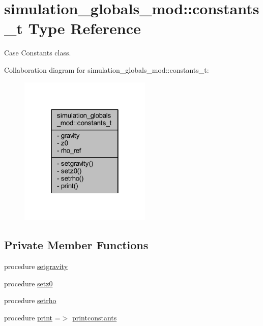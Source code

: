 \hypertarget{structsimulation__globals__mod_1_1constants__t}{}\section{simulation\+\_\+globals\+\_\+mod\+:\+:constants\+\_\+t Type Reference}
\label{structsimulation__globals__mod_1_1constants__t}


Case Constants class.  




Collaboration diagram for simulation\+\_\+globals\+\_\+mod\+:\+:constants\+\_\+t\+:
\nopagebreak
\begin{figure}[H]
\begin{center}
\leavevmode
\includegraphics[width=178pt]{structsimulation__globals__mod_1_1constants__t__coll__graph}
\end{center}
\end{figure}
\subsection*{Private Member Functions}
\begin{DoxyCompactItemize}
\item 
procedure \mbox{\hyperlink{structsimulation__globals__mod_1_1constants__t_af7a73fd39f95eb68c5d070c08d14bb4d}{setgravity}}
\item 
procedure \mbox{\hyperlink{structsimulation__globals__mod_1_1constants__t_a0ad20f9a9b8c4fd0a6813415e690353a}{setz0}}
\item 
procedure \mbox{\hyperlink{structsimulation__globals__mod_1_1constants__t_a184df716402820585a1edbf2933215ec}{setrho}}
\item 
procedure \mbox{\hyperlink{structsimulation__globals__mod_1_1constants__t_a920570af3904fb782a96d3765e314468}{print}} =$>$ \mbox{\hyperlink{namespacesimulation__globals__mod_a20ba28d72a9bea823d9373a94f97026e}{printconstants}}
\end{DoxyCompactItemize}

